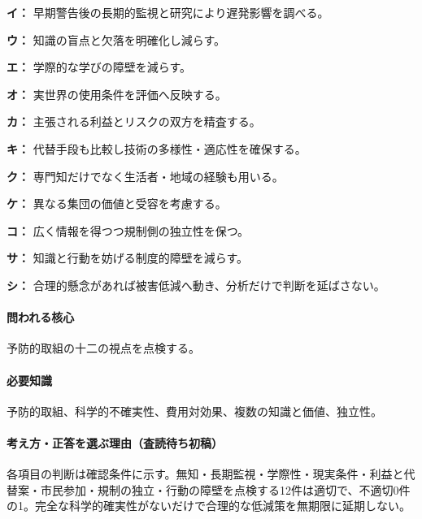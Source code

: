 \noindent\textbf{イ：} 早期警告後の長期的監視と研究により遅発影響を調べる。\par

\noindent\textbf{ウ：} 知識の盲点と欠落を明確化し減らす。\par

\noindent\textbf{エ：} 学際的な学びの障壁を減らす。\par

\noindent\textbf{オ：} 実世界の使用条件を評価へ反映する。\par

\noindent\textbf{カ：} 主張される利益とリスクの双方を精査する。\par

\noindent\textbf{キ：} 代替手段も比較し技術の多様性・適応性を確保する。\par

\noindent\textbf{ク：} 専門知だけでなく生活者・地域の経験も用いる。\par

\noindent\textbf{ケ：} 異なる集団の価値と受容を考慮する。\par

\noindent\textbf{コ：} 広く情報を得つつ規制側の独立性を保つ。\par

\noindent\textbf{サ：} 知識と行動を妨げる制度的障壁を減らす。\par

\noindent\textbf{シ：} 合理的懸念があれば被害低減へ動き、分析だけで判断を延ばさない。\par

\paragraph{問われる核心} 予防的取組の十二の視点を点検する。

\paragraph{必要知識} 予防的取組、科学的不確実性、費用対効果、複数の知識と価値、独立性。

\paragraph{考え方・正答を選ぶ理由（査読待ち初稿）} 各項目の判断は確認条件に示す。無知・長期監視・学際性・現実条件・利益と代替案・市民参加・規制の独立・行動の障壁を点検する12件は適切で、不適切0件の1。完全な科学的確実性がないだけで合理的な低減策を無期限に延期しない。

